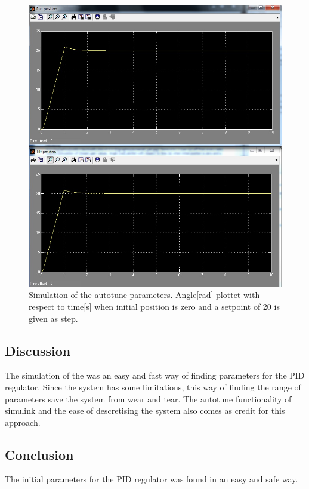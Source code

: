 \begin{figure}[htb]
	\centering
	\includegraphics[width=\textwidth,trim=0 0 0 0]{graphics/screensh_pid.jpg} %
	\caption{Simulation of the autotune parameters. Angle[rad] plottet with respect to time[s] when initial position is zero and a setpoint of 20 is given as step.}
	\label{fig:chosen_plot}			%
\end{figure}

\subsection{Discussion}
The simulation of the was an easy and fast way of finding parameters for the PID regulator. Since the system has some limitations, this way of finding the range of parameters save the system from wear and tear. The autotune functionality of simulink and the ease of descretising the system also comes as credit for this approach.

\subsection{Conclusion}
The initial parameters for the PID regulator was found in an easy and safe way.

